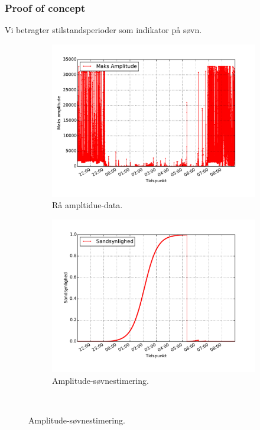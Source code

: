 \begin{frame}
\frametitle{Proof of concept}
Vi betragter stilstandsperioder som indikator på søvn.

\begin{figure}
	\begin{minipage}{\linewidth}
		\begin{subfigure}{0.5\linewidth}
			\centering
			\includegraphics[scale=0.27, trim = 1cm 1cm 1cm 1cm, clip]{../Report/grafik/kombi_figur/amplitude-plot}
			\caption{Rå ampltidue-data.}
		\end{subfigure}
		\begin{subfigure}{0.5\linewidth}
			\centering
			\includegraphics[scale=0.27, trim = 1cm 1cm 1cm 1cm, clip]{../Report/grafik/kombi_figur/amplitude-sleep-estimate-plot}
			\caption{Amplitude-søvnestimering.}
		\end{subfigure}
	\end{minipage}\\[1ex]%
\end{figure}

\end{frame}

